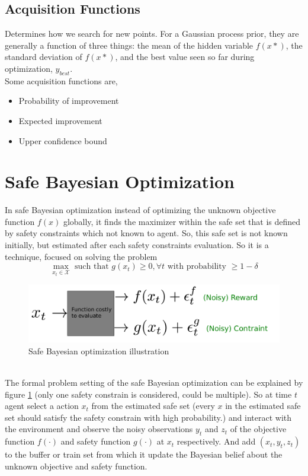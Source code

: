 \subsection{Acquisition Functions}
Determines how we search for new points. For a Gaussian process prior, they are generally a function of three things: the mean of the hidden variable $f(x*)$, the standard deviation of $f(x*)$, and the best value seen so far during optimization, $y_{best}$.\\
Some acquisition functions are,
\begin{itemize}
	\item Probability of improvement
	\item Expected improvement
	\item Upper confidence bound
\end{itemize}

\section{Safe Bayesian Optimization}
\label{sec:safebo}
In safe Bayesian optimization instead of optimizing the unknown objective function $f(x)$ globally, it finds the maximizer within the safe set that is defined by safety constraints which not known to agent. 
So, this safe set is not known initially, but estimated after each safety constraints evaluation. So it is a technique, focused on solving the problem
$$ \max_{x_t\in\mathcal{X}}\text{ such that }g(x_t)\geq 0, \forall t\text{ with probability }\geq 1-\delta $$
\begin{figure}[h]
	\centering
	\includegraphics[scale=0.30]{figures/safebo.png}
	\caption{Safe Bayesian optimization illustration}
	\label{fig:safebo}
\end{figure}
\\
The formal problem setting of the safe Bayesian optimization can be explained by figure \ref{fig:safebo} (only one safety constrain is considered, could be multiple).
So at time $t$ agent select a action $x_t$ from the estimated safe set (every $x$ in the estimated safe set should satisfy the safety constrain with high probability.) and interact with the environment and observe the noisy observations $y_t$ and $z_t$ of the objective function $f(\cdot)$ and safety function $g(\cdot)$ at $x_t$ respectively. And add $(x_t , y_t , z_t )$ to the buffer or train set from which it update the Bayesian belief about the unknown objective and safety function.

